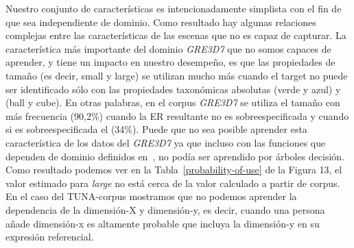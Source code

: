 Nuestro conjunto de caracter\'{i}sticas es intencionadamente simplista con el fin de que sea
independiente de dominio. Como resultado hay algunas relaciones complejas
entre las caracter\'{i}sticas de las escenas que no es capaz de
capturar. La caracter\'{i}stica m\'as importante del dominio \textit{GRE3D7}
que no somos capaces de aprender, y tiene un impacto en nuestro desempe\~no, es que
las propiedades de tama\~no (es decir, small y large) se utilizan mucho
m\'as cuando el target no puede ser identificado s\'olo con las propiedades taxon\'omicas absolutas 
(verde y azul) y (ball y cube). En otras palabras, en el corpus \textit{GRE3D7} se utiliza el tama\~no con m\'as frecuencia (90,2\%)
cuando la ER resultante no es sobreespecificada y cuando si es sobreespecificada el (34\%). 
Puede que no sea posible aprender esta caracter\'{i}stica de los
datos del \textit{GRE3D7} ya que incluso con las funciones que dependen de dominio definidos
en~\cite[Cap\'{i}tulo 6] {viet:gene11}, no pod\'{i}a ser aprendido por \'arboles decisi\'on. 
Como resultado podemos ver en la Tabla~\ref{probability-of-use} de la Figura 13, el valor estimado para 
\emph{large} no est\'a cerca de la
valor calculado a partir de corpus. En el caso del TUNA-corpus
  mostramos que no podemos aprender la dependencia de la dimensi\'on-X y
  dimensi\'on-y, es decir, cuando una persona a\~nade dimensi\'on-x es altamente
  probable que incluya la dimensi\'on-y en su expresi\'on referencial.

